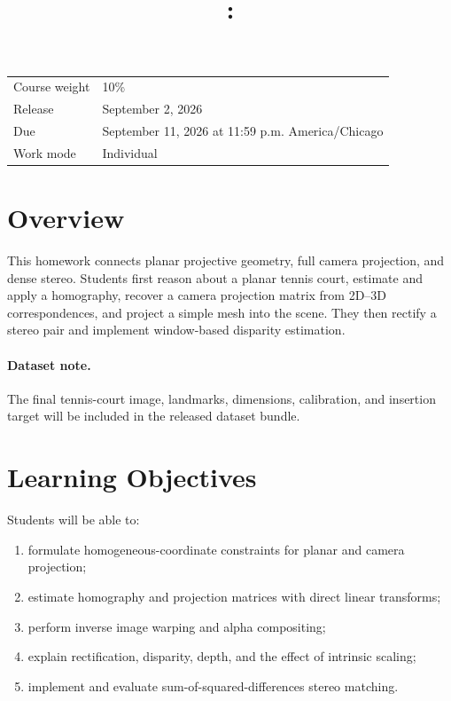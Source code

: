 \documentclass[11pt]{article}
\title{\CourseName\\\HomeworkNumber: \HomeworkTitle}
\author{\Term}
\date{}
\newcommand{\CourseWeight}{10\%}
\newcommand{\ReleaseDate}{September 2, 2026}
\newcommand{\DueDate}{September 11, 2026 at 11:59 p.m. America/Chicago}
\begin{document}
\maketitle

\begin{center}
\begin{tabular}{ll}
\toprule
Course weight & \CourseWeight \\
Release & \ReleaseDate \\
Due & \DueDate \\
Work mode & Individual \\
\bottomrule
\end{tabular}
\end{center}

\section{Overview}
This homework connects planar projective geometry, full camera projection, and
dense stereo. Students first reason about a planar tennis court, estimate and
apply a homography, recover a camera projection matrix from 2D--3D
correspondences, and project a simple mesh into the scene. They then rectify a
stereo pair and implement window-based disparity estimation.

\paragraph{Dataset note.}
The final tennis-court image, landmarks, dimensions, calibration, and insertion
target will be included in the released dataset bundle.

\section{Learning Objectives}
Students will be able to:
\begin{enumerate}[label=\arabic*.]
  \item formulate homogeneous-coordinate constraints for planar and camera projection;
  \item estimate homography and projection matrices with direct linear transforms;
  \item perform inverse image warping and alpha compositing;
  \item explain rectification, disparity, depth, and the effect of intrinsic scaling;
  \item implement and evaluate sum-of-squared-differences stereo matching.
\end{enumerate}
\end{document}

